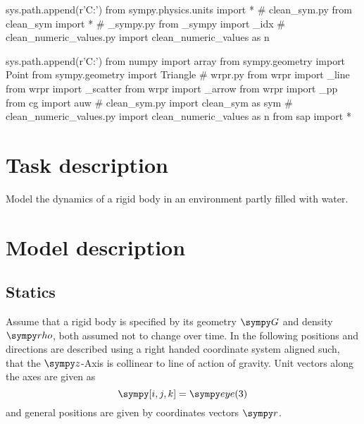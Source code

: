 
\tableofcontents

\begin{sympycode}
sys.path.append(r'C:\Users\Murad\evrythg')
from sympy.physics.units import *
# clean_sym.py
from clean_sym import *
# _sympy.py 
from _sympy import _idx
# clean_numeric_values.py
import clean_numeric_values as n
\end{sympycode}

\begin{pylabcode}
sys.path.append(r'C:\Users\Murad\evrythg')
from numpy import array
from sympy.geometry import Point
from sympy.geometry import Triangle
# wrpr.py
from wrpr import _line
from wrpr import _scatter
from wrpr import _arrow
from wrpr import _pp
from cg import  auw
# clean_sym.py
import clean_sym as sym
# clean_numeric_values.py
import clean_numeric_values as n
from sap import *
\end{pylabcode}


\section{Task description}
Model the dynamics of a rigid body in an environment partly filled with water.
\section{Model description}
\subsection{Statics}
Assume that a rigid body is specified by its geometry $\s{G}$ and density $\s{rho}$, both assumed not to change over time.    In the following positions and directions are described using a right handed coordinate system aligned such, that the $\s{z}$-Axis is collinear to line of action of gravity.  Unit vectors along the axes are given as
\begin{equation*}
\s{[i, j, k]} = \s{eye(3)}
\end{equation*}
and general positions are given by coordinates vectors $\s{r}$.  


